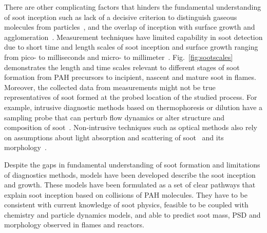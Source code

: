 There are other complicating factors that hinders the fundamental understanding of soot inception such as lack of a decisive criterion to distinguish gaseous molecules from particles~\citep{d2009combustion}, and the overlap of inception with surface growth and agglomeration~\cite{martin2022soot}. Measurement techniques have limited capability in soot detection due to short time and length scales of soot inception and surface growth ranging from pico- to milliseconds and micro- to millimeter~\citep{violi2005relative}. Fig.~\ref{fig:sootscales} demonstrates the length and time scales relevant to different stages of soot formation from PAH precursors to incipient, nascent and mature soot in flames. Moreover, the collected data from measurements might not be true representatives of soot formed at the probed location of the studied process. For example, intrusive diagnostic methods based on thermophoresis or dilution have a sampling probe that can perturb flow dynamics or alter structure and composition of soot~\cite{kholghy2017comparison}. Non-intrusive techniques such as optical methods also rely on assumptions about light absorption and scattering of soot~\citep{shaddix1996laser} and its morphology~\citep{doner2017impact}.


Despite the gaps in fundamental understanding of soot formation and limitations of diagnostics methods, models have been developed describe the soot inception and growth. These models have been formulated as a set of clear pathways that explain soot inception based on collisions of PAH molecules. They have to be consistent with current knowledge of soot physics, feasible to be coupled with chemistry and particle dynamics models, and able to predict soot mass, PSD and morphology observed in flames and reactors.


